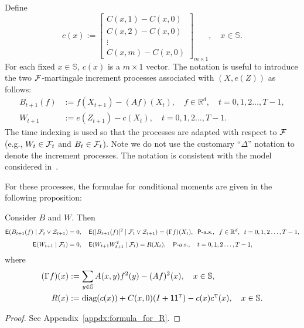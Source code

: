 \documentclass[twoside,11pt]{article}
\def\Re{\mathbb{R}}
\newcommand{\field}[1]{\mathbb{#1}}
\def\Re{\field{R}}
\def\transpose{{\hbox{\rm\tiny T}}}
\def\clZ{{\cal Z}}
\def\E{{\sf E}}
\def\clZ{{\cal Z}}
\def\bS{\begin{slide}}
\def\Re{\mathbb{R}}
\def\E{{\sf E}}
\def\clZ{{\cal Z}}
\renewcommand{\Re}{\mathbb{R}}
\def\clF{{\cal F}}
\def\clZ{{\cal Z}}
\def\E{{\sf E}}
\def\bS{\mathbb{S}}
\def\ones{{\sf 1}}
\def\sP{{\sf P}}
\begin{document}
Define
\begin{equation*}
c(x) := \begin{bmatrix} C(x,1) - C(x,0) \\ C(x,2) - C(x,0) \\ \vdots \\
  C(x,m) - C(x,0) \end{bmatrix}_{m\times 1},\quad x\in\bS.
\end{equation*}
For each fixed $x\in \bS$, $c(x)$ is a $m\times 1$ vector.
The notation is useful to introduce the two $\clF$-martingale increment processes associated with $(X,e(Z))$ as follows:
\begin{align*}
  B_{t+1}(f) &:= f(X_{t+1}) - (Af)(X_t), \quad f\in \Re^d, \quad t=0,1,2\hdots,T-1,\\
  W_{t+1} &:= e(Z_{t+1}) - c(X_t), \quad t=0,1,2\hdots,T-1.
\end{align*}
The time indexing is used so that the processes are adapted with
respect to $\clF$ (e.g., $W_{t} \in \clF_{t}$ and $B_{t} \in
\clF_{t}$). Note we do not use the customary ``$\Delta$'' notation to
denote the increment processes.  The notation is consistent with the
model considered in~\cite[Chapter~2]{elliott2008hidden}.

For these processes, the formulae for conditional moments are given in the following proposition: 
\begin{proposition}\label{prop:B_W_Gamma_R}
  Consider $B$ and $W$. Then
  \begin{align*}
    \E(B_{t+1}(f) \mid \clF_{t}\vee \clZ_{t+1}) &=0, \quad  \E(|B_{t+1}(f)|^2\mid\clF_{t}\vee \clZ_{t+1}) = (\Gamma f)(X_t),\;\; \sP\text{-a.s.},\;\; f\in\Re^d , \;\; t=0,1,2\hdots,T-1,\\[5pt]
    \E(W_{t+1} \mid \clF_t) &=0,\quad \E(W_{t+1} W_{t+1}^\transpose \mid \clF_t) = R(X_t) , \quad \sP\text{-a.s.}, \quad t=0,1,2\hdots,T-1,
  \end{align*}
  where
  \begin{align*}
    (\Gamma f)(x) &:= \sum_{y\in\bS} A(x,y) f^2(y) - (Af)^2(x),\quad x\in\bS, \\
    R(x) &:=  \text{diag}(c(x)) + C(x,0) (I+\ones \ones^\transpose)  - c(x) c^\transpose (x), \quad x\in\bS.
  \end{align*}
\end{proposition}
\begin{proof}
 See Appendix~\ref{appdx:formula_for_R}.
\end{proof}

\end{document}
